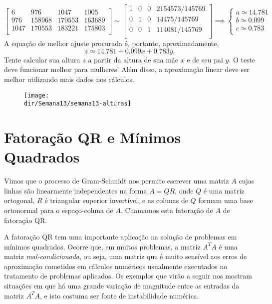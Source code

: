 \documentclass[../livro.tex]{subfiles}  %
\providecommand{\dir}{..}
\begin{document}
\begin{example}
\begin{equation}
\begin{bmatrix}
    6    & 976    & 1047   & 1005     \\
    976  & 158968 & 170553 & 163689   \\
    1047 & 170553 & 183221 & 175803   \\
  \end{bmatrix} \sim
  \begin{bmatrix}
    1 & 0 & 0  & 2154573/145769 \\
    0 & 1 & 0  & 14475/145769   \\
    0 & 0 & 1  & 114081/145769  \\
  \end{bmatrix} \implies
  \left\{
    \begin{array}{ll}
      a \simeq 14.781  \\
      b \simeq  0.099  \\
      c \simeq  0.783  \\
    \end{array}
  \right.
  \end{equation} A equação de melhor ajuste procurada é, portanto, aproximadamente,
  \begin{equation}
  z \simeq 14.781 + 0.099 x + 0.783 y.
  \end{equation} Tente calcular sua altura $z$ a partir da altura de sua mãe $x$ e de seu pai $y$. O teste deve funcionar melhor para mulheres! Além disso, a aproximação linear deve ser melhor utilizando mais dados nos cálculos.
  \begin{figure}[h!]
    \begin{center}
      \texttt{[image: \\dir/Semana13/semana13-alturas]}
    \end{center}
  \end{figure}
\end{example}

\section{Fatoração QR e Mínimos Quadrados}

Vimos que o processo de Gram-Schmidt nos permite escrever uma matriz $A$ cujas linhas são linearmente independentes na forma $A=QR$, onde $Q$ é uma matriz ortogonal, $R$ é triangular superior invertível, e as colunas de $Q$ formam uma base ortonormal para o espaço-coluna de $A$. Chamamos esta fatoração de $A$ de fatoração QR. 

A fatoração QR tem uma importante aplicação na solução de problemas em mínimos quadrados. Ocorre que, em muitos problemas, a matriz $A^T A$ é uma matriz {\it mal-condicionada}, ou seja, uma matriz que é muito sensível aos erros de aproximação cometidos em cálculos numéricos usualmente executados no tratamento de problemas aplicados. 
Os exemplos que virão a seguir nos mostram situações em que há uma grande variação de magnitude entre as entradas da matriz $A^T A$, e isto costuma ser fonte de instabilidade numérica.
\end{document}
